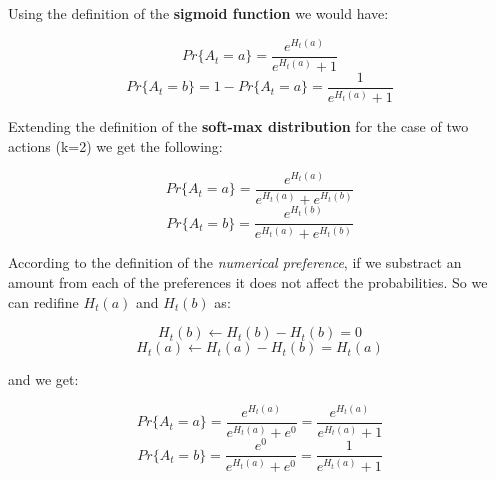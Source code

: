 \documentclass[12pt]{article}
\begin{document}
\thispagestyle{empty}

\noindent Using the definition of the \textbf{sigmoid function} we would have:

$$Pr\{A_t = a\} = \frac{e^{H_t(a)}}{e^{H_t(a)} + 1}$$
$$Pr\{A_t = b\} = 1 - Pr\{A_t = a\} = \frac{1}{e^{H_t(a)} + 1}$$

\noindent Extending the definition of the \textbf{soft-max distribution} for the case of two actions (k=2) we get the following:

$$Pr\{A_t=a\} = \frac{e^{H_t(a)}}{e^{H_t(a)} + e^{H_t(b)}}$$
$$Pr\{A_t=b\} = \frac{e^{H_t(b)}}{e^{H_t(a)} + e^{H_t(b)}}$$

\noindent According to the definition of the \textit{numerical preference}, if we substract an amount from each of the preferences
it does not affect the probabilities. So we can redifine $H_t(a)$ and $H_t(b)$ as:

$$H_t(b) \leftarrow  H_t(b) - H_t(b) = 0$$
$$H_t(a) \leftarrow  H_t(a) - H_t(b) = H_t(a)$$

\noindent and we get:

$$Pr\{A_t=a\} = \frac{e^{H_t(a)}}{e^{H_t(a)} + e^0} = \frac{e^{H_t(a)}}{e^{H_t(a)} + 1} $$
$$Pr\{A_t=b\} = \frac{e^{0}}{e^{H_t(a)} + e^{0}} = \frac{1}{e^{H_t(a)} + 1}$$
\end{document}
